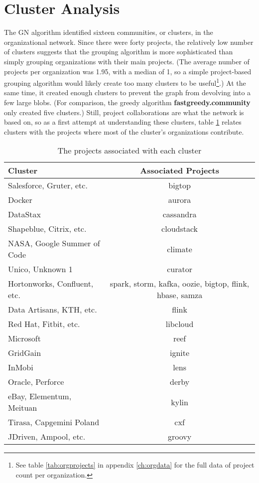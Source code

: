 \section{Cluster Analysis}\label{clustersection}
The GN algorithm identified sixteen communities, or clusters, in the organizational network. Since there were forty projects, the relatively low number of clusters suggests that the grouping algorithm is more sophisticated than simply grouping organizations with their main projects. (The average number of projects per organization was 1.95, with a median of 1, so a simple project-based grouping algorithm would likely create too many clusters to be useful\footnote{See table \ref{tab:orgprojects} in appendix \ref{ch:orgdata} for the full data of project count per organization.}.) At the same time, it created enough clusters to prevent the graph from devolving into a few large blobs. (For comparison, the greedy algorithm \textbf{fastgreedy.community} only created five clusters.)
  Still, project collaborations are what the network is based on, so as a first attempt at understanding these clusters, table \ref{tab:clusterprojects} relates clusters with the projects where most of the cluster's organizations contribute.

\begin{table}
	\begin{tabular}{l|c}
		\bfseries Cluster & \bfseries Associated Projects \\
		\hline
		Salesforce, Gruter, etc. & bigtop \\
		\hline
		Docker & aurora \\
		\hline
		DataStax & cassandra \\
		\hline
		Shapeblue, Citrix, etc. & cloudstack \\
		\hline
		NASA, Google Summer of Code & climate \\
		\hline
		Unico, Unknown 1 & curator \\
		\hline
		Hortonworks, Confluent, etc. & spark, storm, kafka, oozie, bigtop, flink, hbase, samza \\
		\hline
		Data Artisans, KTH, etc. & flink \\
		\hline
		Red Hat, Fitbit, etc. & libcloud \\
		\hline
		Microsoft & reef \\
		\hline
		GridGain & ignite \\
		\hline
		InMobi & lens \\
		\hline
		Oracle, Perforce & derby \\
		\hline
		eBay, Elementum, Meituan & kylin \\
		\hline
		Tirasa, Capgemini Poland & cxf \\
		\hline
		JDriven, Ampool, etc. & groovy
	\end{tabular}
	\caption{The projects associated with each cluster}\label{tab:clusterprojects}
\end{table}

